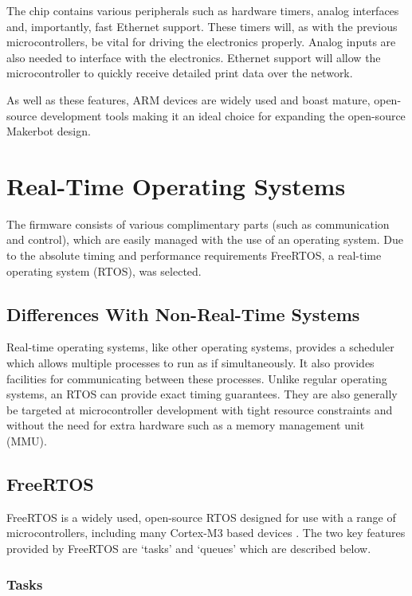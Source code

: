 			The chip contains various peripherals such as hardware timers, analog
			interfaces and, importantly, fast Ethernet support. These timers will, as
			with the previous microcontrollers, be vital for driving the electronics
			properly. Analog inputs are also needed to interface with the electronics.
			Ethernet support will allow the microcontroller to quickly receive
			detailed print data over the network.
			
			As well as these features, ARM devices are widely used and boast mature,
			open-source development tools making it an ideal choice for expanding the
			open-source Makerbot design.
			
	\section{Real-Time Operating Systems}
		
		The firmware consists of various complimentary parts (such as communication
		and control), which are easily managed with the use of an operating system.
		Due to the absolute timing and performance requirements FreeRTOS, a
		real-time operating system (RTOS), was selected.
		
		\subsection{Differences With Non-Real-Time Systems}
			
			Real-time operating systems, like other operating systems, provides a
			scheduler which allows multiple processes to run as if simultaneously. It
			also provides facilities for communicating between these processes. Unlike
			regular operating systems, an RTOS can provide exact timing guarantees.
			They are also generally be targeted at microcontroller development with
			tight resource constraints and without the need for extra hardware such as
			a memory management unit (MMU).
			
		\subsection{FreeRTOS}
			
			FreeRTOS is a widely used, open-source RTOS designed for use with a range
			of microcontrollers, including many Cortex-M3 based devices
			\cite{freertos}. The two key features provided by FreeRTOS are `tasks' and
			`queues' which are described below.
			
			\subsubsection{Tasks}
				
